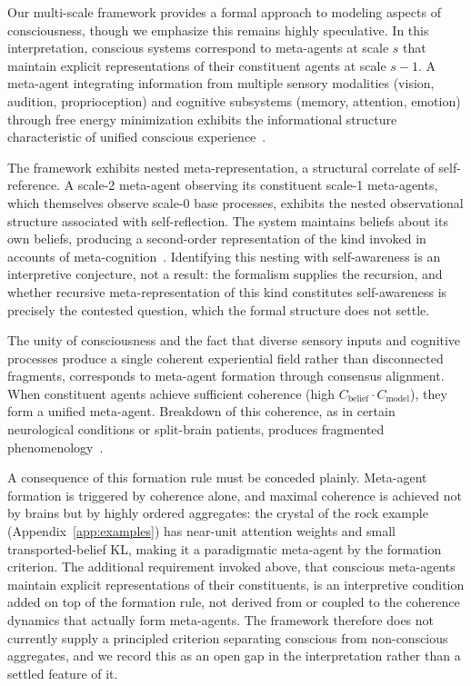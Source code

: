 \documentclass[11pt]{article}
\begin{document}
Our multi-scale framework provides a formal approach to modeling aspects of consciousness, though we emphasize this remains highly speculative. In this interpretation, conscious systems correspond to meta-agents at scale $s$ that maintain explicit representations of their constituent agents at scale $s-1$. A meta-agent integrating information from multiple sensory modalities (vision, audition, proprioception) and cognitive subsystems (memory, attention, emotion) through free energy minimization exhibits the informational structure characteristic of unified conscious experience~\cite{Tononi2004, Dehaene2014}.

The framework exhibits nested meta-representation, a structural correlate of self-reference. A scale-2 meta-agent observing its constituent scale-1 meta-agents, which themselves observe scale-0 base processes, exhibits the nested observational structure associated with self-reflection. The system maintains beliefs about its own beliefs, producing a second-order representation of the kind invoked in accounts of meta-cognition~\cite{Cleeremans2007}. Identifying this nesting with self-awareness is an interpretive conjecture, not a result: the formalism supplies the recursion, and whether recursive meta-representation of this kind constitutes self-awareness is precisely the contested question, which the formal structure does not settle.

The unity of consciousness and the fact that diverse sensory inputs and cognitive processes produce a single coherent experiential field rather than disconnected fragments, corresponds to meta-agent formation through consensus alignment. When constituent agents achieve sufficient coherence (high $C_{\text{belief}} \cdot C_{\text{model}}$), they form a unified meta-agent. Breakdown of this coherence, as in certain neurological conditions or split-brain patients, produces fragmented phenomenology~\cite{Bayne2010}.

A consequence of this formation rule must be conceded plainly. Meta-agent formation is triggered by coherence alone, and maximal coherence is achieved not by brains but by highly ordered aggregates: the crystal of the rock example (Appendix~\ref{app:examples}) has near-unit attention weights and small transported-belief KL, making it a paradigmatic meta-agent by the formation criterion. The additional requirement invoked above, that conscious meta-agents maintain explicit representations of their constituents, is an interpretive condition added on top of the formation rule, not derived from or coupled to the coherence dynamics that actually form meta-agents. The framework therefore does not currently supply a principled criterion separating conscious from non-conscious aggregates, and we record this as an open gap in the interpretation rather than a settled feature of it.
\end{document}
